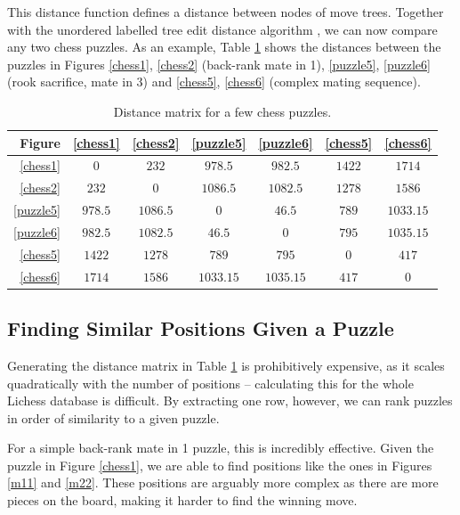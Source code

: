 This distance function defines a distance between nodes of move trees. Together
with the unordered labelled tree edit distance algorithm \citep{editDistTrees},
we can now compare any two chess puzzles. As an example, Table
\ref{distanceComparisons} shows the distances between the puzzles in Figures
\ref{chess1}, \ref{chess2} (back-rank mate in 1), \ref{puzzle5}, \ref{puzzle6}
(rook sacrifice, mate in 3) and \ref{chess5}, \ref{chess6} (complex mating
sequence).

\begin{table}[H]
  \centering
  \begin{tabular}{r|cccccc}
    Figure &
    \ref{chess1}&\ref{chess2}&\ref{puzzle5}&\ref{puzzle6}&\ref{chess5}&\ref{chess6}
    \\
    \hline
    \ref{chess1} & $0$ & $232$ & $978.5$ & $982.5$ & $1422$ & $1714$ \\ 
    \ref{chess2} & $232$ & $0$ & $1086.5$ & $1082.5$ & $1278$ & $1586$ \\
    \ref{puzzle5} & $978.5$ & $1086.5$ & $0$ & $46.5$ & $789$ & $1033.15$ \\
    \ref{puzzle6} & $982.5$ & $1082.5$ & $46.5$ & $0$ & $795$ & $1035.15$ \\
    \ref{chess5} & $1422$ & $1278$ & $789$ & $795$ & $0$ & $417$ \\
    \ref{chess6} & $1714$ & $1586$ & $1033.15$ & $1035.15$ & $417$ & $0$ \\
  \end{tabular}
  \caption{Distance matrix for a few chess puzzles.}
  \label{distanceComparisons}
\end{table}

\subsection{Finding Similar Positions Given a Puzzle}\label{treeS21}

Generating the distance matrix in Table \ref{distanceComparisons} is
prohibitively expensive, as it scales quadratically with the number of
positions -- calculating this for the whole Lichess database is difficult. By
extracting one row, however, we can rank puzzles in order of similarity to a
given puzzle.

For a simple back-rank mate in 1 puzzle, this is incredibly effective. Given
the puzzle in Figure \ref{chess1}, we are able to find positions like the ones
in Figures \ref{m11} and \ref{m22}. These positions are arguably more complex
as there are more pieces on the board, making it harder to find the winning
move.

